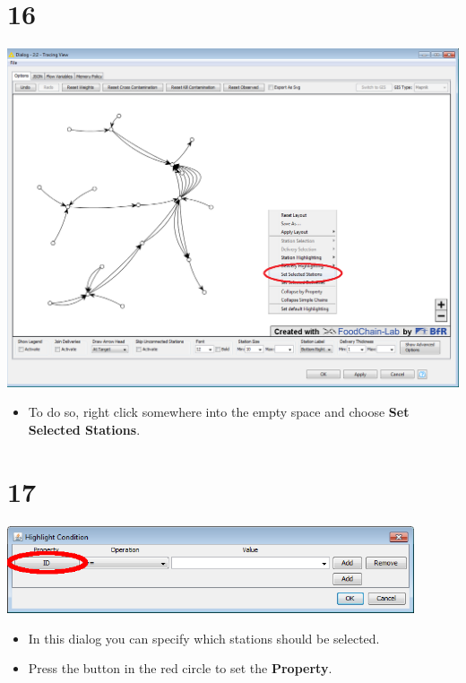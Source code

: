 \documentclass[10pt]{beamer}
\begin{document}
\section{16}
\begin{frame}
	\begin{center}
  		\includegraphics[height=0.6\textheight]{16.png}
	\end{center}
	\begin{itemize}
		\item To do so, right click somewhere into the empty space and choose \textbf{Set Selected Stations}.
	\end{itemize}
\end{frame}

\section{17}
\begin{frame}
	\begin{center}
  		\includegraphics[width=0.9\textwidth]{17.png}
	\end{center}
	\begin{itemize}
		\item In this dialog you can specify which stations should be selected.
		\item Press the button in the red circle to set the \textbf{Property}.
	\end{itemize}
\end{frame}
\end{document}
